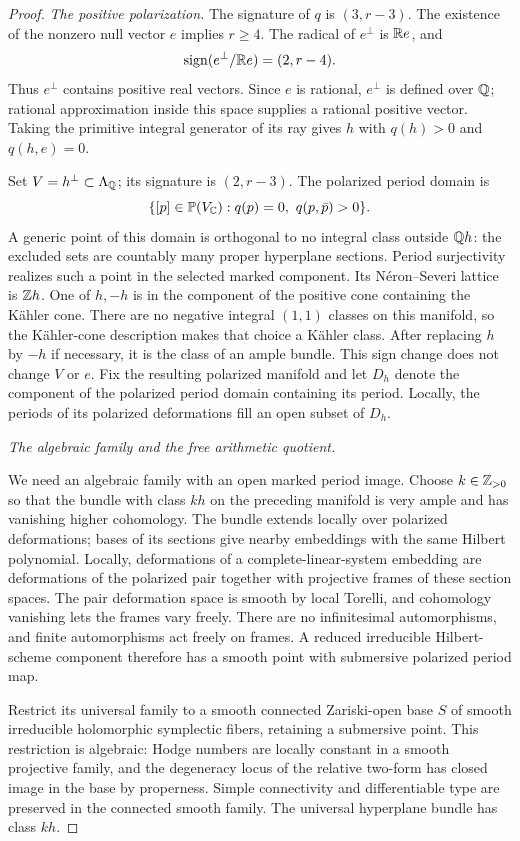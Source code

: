 \begin{proof}
\emph{The positive polarization.}
The signature of $q$ is $(3,r-3)$.  The existence of the nonzero
null vector $e$ implies $r\ge4$.  The radical of $e^\perp$ is $\mathbb R e$,
and
\[
 \operatorname{sign}(e^\perp/\mathbb R e)=(2,r-4).
\]
Thus $e^\perp$ contains positive real vectors.  Since $e$ is rational,
$e^\perp$ is defined over $\mathbb Q$; rational approximation inside this
space supplies a rational positive vector. Taking the primitive
integral generator of its ray gives $h$ with
$q(h)>0$ and $q(h,e)=0$.

Set $V=h^\perp\subset\Lambda_{\mathbb Q}$; its signature is $(2,r-3)$.
The polarized period domain is
\[
 \{[p]\in\mathbb P(V_{\mathbb C}):q(p)=0,\ q(p,\bar p)>0\}.
\]
A generic point of this domain is orthogonal to no integral class
outside $\mathbb Q h$: the excluded sets are countably many proper
hyperplane sections.  Period surjectivity realizes such a point
in the selected marked component.  Its Néron--Severi lattice is
$\mathbb Z h$.  One of $h,-h$ is in the component of the positive cone
containing the Kähler cone.  There are no negative integral
$(1,1)$ classes on this manifold, so the Kähler-cone description
makes that choice a Kähler class.  After replacing $h$ by $-h$ if
necessary, it is the class of an ample bundle.  This sign change
does not change $V$ or $e$.  Fix the resulting polarized manifold
and let $D_h$ denote the component of the polarized period domain
containing its period.  Locally, the periods of its polarized
deformations fill an open subset of $D_h$.

\smallskip\noindent\emph{The algebraic family and the free arithmetic quotient.}

We need an algebraic family with an open marked period image.
Choose $k\in\mathbb Z_{>0}$ so that the bundle with class $kh$ on the preceding
manifold is very ample and has vanishing higher cohomology.  The
bundle extends locally over polarized deformations; bases of its
sections give nearby embeddings with the same Hilbert polynomial.
Locally, deformations of a complete-linear-system embedding are
deformations of the polarized pair together with projective frames
of these section spaces.  The pair deformation space is smooth by
local Torelli, and cohomology vanishing lets the frames vary freely.
There are no infinitesimal automorphisms, and finite automorphisms
act freely on frames.  A reduced irreducible Hilbert-scheme component
therefore has a smooth point with submersive polarized period map.

Restrict its universal family to a smooth connected Zariski-open
base $S$ of smooth irreducible holomorphic symplectic fibers,
retaining a submersive point.  This restriction is algebraic:
Hodge numbers are locally constant in a smooth projective family,
and the degeneracy locus of the relative two-form has closed image
in the base by properness.  Simple connectivity and differentiable
type are preserved in the connected smooth family.  The universal
hyperplane bundle has class $kh$.


\end{proof}
